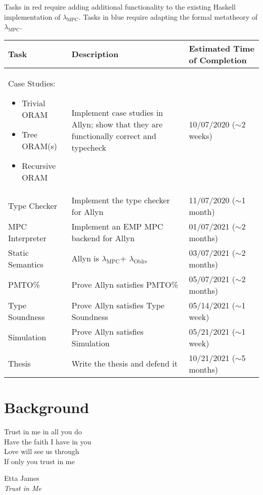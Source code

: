 \documentclass{report}
\newcommand{\lang}{Allyn\xspace}
\newcommand{\mpc}{\ensuremath{\lambda_{\mathrm{MPC}}}\xspace}
\newcommand{\obliv}{\ensuremath{\lambda_{\mathrm{Obliv}}}\xspace}
\begin{document}
Tasks in \colorbox{implColor}{red} require adding additional functionality to the existing Haskell implementation of \mpc.
Tasks in \colorbox{theoryColor}{blue} require adapting the formal metatheory of \mpc. \\

\begin{tabular}{|p{}|p{}|p{}|}
  \hline
  \textbf{Task} & \textbf{Description} & \textbf{Estimated Time of Completion} \\
  \hline
  \rowcolor{implColor}
  Case Studies:
  \begin{itemize}
  \item Trivial ORAM
  \item Tree ORAM(s)
  \item Recursive ORAM
  \end{itemize}    & Implement case studies in \lang;
  show that they are functionally correct and typecheck & 10/07/2020 ($\sim$2 weeks)  \\ \hline
  \rowcolor{implColor}
  Type Checker     & Implement the type checker for \lang                  & 11/07/2020 ($\sim$1 month)  \\ \hline
  \rowcolor{implColor}
  MPC Interpreter  & Implement an EMP MPC backend for \lang                & 01/07/2021 ($\sim$2 months) \\ \hline
  \rowcolor{theoryColor}
  Static Semantics & \lang is \mpc + \obliv                                & 03/07/2021 ($\sim$2 months) \\ \hline
  \rowcolor{theoryColor}
  PMTO\%           & Prove \lang satisfies PMTO\%                          & 05/07/2021 ($\sim$2 months) \\ \hline
  \rowcolor{theoryColor}
  Type Soundness   & Prove \lang satisfies Type Soundness                  & 05/14/2021 ($\sim$1 week)   \\ \hline
  \rowcolor{theoryColor}
  Simulation       & Prove \lang satisfies Simulation                      & 05/21/2021 ($\sim$1 week)   \\ \hline
  Thesis           & Write the thesis and defend it                        & 10/21/2021 ($\sim$5 months) \\ \hline
\end{tabular}


\chapter{Background}
\epigraph{Trust in me in all you do \\
          Have the faith I have in you \\
          Love will see us through \\
          If only you trust in me}{
            Etta James \\
            \emph{Trust in Me}}
\end{document}
